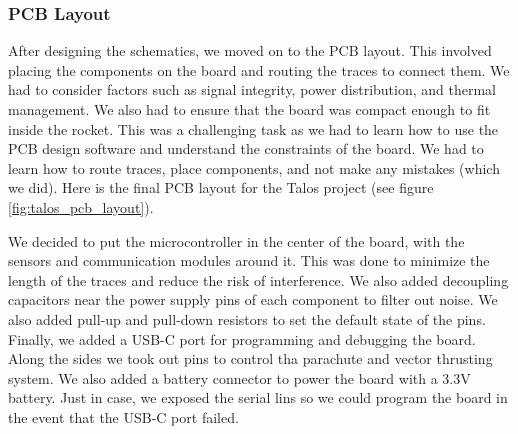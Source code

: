 \documentclass{article}
\begin{document}
\subsubsection{PCB Layout}
After designing the schematics, we moved on to the PCB layout. This involved placing the components on the board and routing the traces to connect them. We had to consider factors such as signal integrity, power distribution, and thermal management. We also had to ensure that the board was compact enough to fit inside the rocket. This was a challenging task as we had to learn how to use the PCB design software and understand the constraints of the board. We had to learn how to route traces, place components, and not make any mistakes (which we did). Here is the final PCB layout for the Talos project (see figure \ref{fig:talos_pcb_layout}).


We decided to put the microcontroller in the center of the board, with the sensors and communication modules around it. This was done to minimize the length of the traces and reduce the risk of interference. We also added decoupling capacitors near the power supply pins of each component to filter out noise. We also added pull-up and pull-down resistors to set the default state of the pins. Finally, we added a USB-C port for programming and debugging the board. Along the sides we took out pins to control tha parachute and vector thrusting system. We also added a battery connector to power the board with a 3.3V battery. Just in case, we exposed the serial lins so we could program the board in the event that the USB-C port failed.
\end{document}
